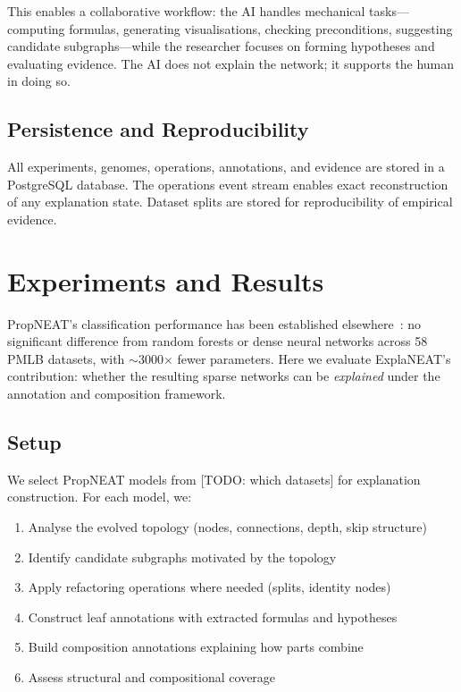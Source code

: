 \documentclass[11pt]{article}
\begin{document}
This enables a collaborative workflow: the AI handles mechanical tasks---computing formulas, generating visualisations, checking preconditions, suggesting candidate subgraphs---while the researcher focuses on forming hypotheses and evaluating evidence. The AI does not explain the network; it supports the human in doing so.

\subsection{Persistence and Reproducibility}

All experiments, genomes, operations, annotations, and evidence are stored in a PostgreSQL database. The operations event stream enables exact reconstruction of any explanation state. Dataset splits are stored for reproducibility of empirical evidence.


\section{Experiments and Results}
\label{sec:results}

PropNEAT's classification performance has been established elsewhere~\cite{merry2025propneat}: no significant difference from random forests or dense neural networks across 58 PMLB datasets, with $\sim$3000$\times$ fewer parameters. Here we evaluate ExplaNEAT's contribution: whether the resulting sparse networks can be \emph{explained} under the annotation and composition framework.

\subsection{Setup}

We select PropNEAT models from [TODO: which datasets] for explanation construction. For each model, we:
\begin{enumerate}
    \item Analyse the evolved topology (nodes, connections, depth, skip structure)
    \item Identify candidate subgraphs motivated by the topology
    \item Apply refactoring operations where needed (splits, identity nodes)
    \item Construct leaf annotations with extracted formulas and hypotheses
    \item Build composition annotations explaining how parts combine
    \item Assess structural and compositional coverage
\end{enumerate}
\end{document}
